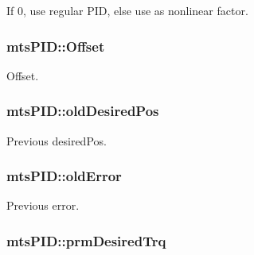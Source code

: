 If 0, use regular P\-I\-D, else use as nonlinear factor. 

\hypertarget{classmts_p_i_d_a34993725f4bc1309971924b62549376c}{
\subsubsection[{Offset}]{ mts\-P\-I\-D\-::\-Offset\hspace{0.3cm}{\ttfamily [protected]}}}\label{classmts_p_i_d_a34993725f4bc1309971924b62549376c}


Offset. 

\hypertarget{classmts_p_i_d_a9bd5876d1e7062eafd4dde4e2914adab}{
\subsubsection[{old\-Desired\-Pos}]{ mts\-P\-I\-D\-::old\-Desired\-Pos\hspace{0.3cm}{\ttfamily [protected]}}}\label{classmts_p_i_d_a9bd5876d1e7062eafd4dde4e2914adab}


Previous desired\-Pos. 

\hypertarget{classmts_p_i_d_ad9b05536756b06bd08374606fa615dc6}{
\subsubsection[{old\-Error}]{ mts\-P\-I\-D\-::old\-Error\hspace{0.3cm}{\ttfamily [protected]}}}\label{classmts_p_i_d_ad9b05536756b06bd08374606fa615dc6}


Previous error. 

\hypertarget{classmts_p_i_d_a6be58279848adac1f3612c320cf182ea}{
\subsubsection[{prm\-Desired\-Trq}]{ mts\-P\-I\-D\-::prm\-Desired\-Trq\hspace{0.3cm}{\ttfamily [protected]}}}\label{classmts_p_i_d_a6be58279848adac1f3612c320cf182ea}



